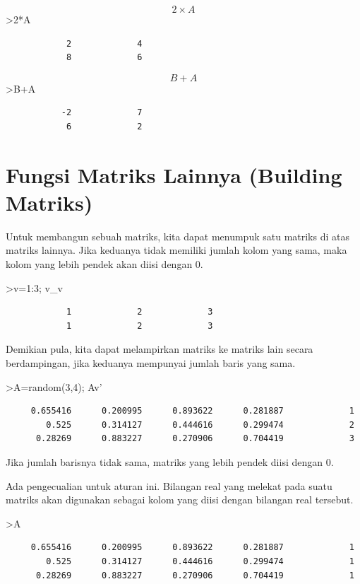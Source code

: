 \documentclass[
]{book}
\begin{document}
\[2 \times A\]\textgreater2*A

\begin{verbatim}
            2             4 
            8             6 
\end{verbatim}

\[B+A\]\textgreater B+A

\begin{verbatim}
           -2             7 
            6             2 
\end{verbatim}

\chapter{Fungsi Matriks Lainnya (Building Matriks)}\label{fungsi-matriks-lainnya-building-matriks}

Untuk membangun sebuah matriks, kita dapat menumpuk satu matriks di atas matriks lainnya. Jika keduanya tidak memiliki jumlah kolom yang sama, maka kolom yang lebih pendek akan diisi dengan 0.

\textgreater v=1:3; v\_v

\begin{verbatim}
            1             2             3 
            1             2             3 
\end{verbatim}

Demikian pula, kita dapat melampirkan matriks ke matriks lain secara berdampingan, jika keduanya mempunyai jumlah baris yang sama.

\textgreater A=random(3,4); A\textbar v'

\begin{verbatim}
     0.655416      0.200995      0.893622      0.281887             1 
        0.525      0.314127      0.444616      0.299474             2 
      0.28269      0.883227      0.270906      0.704419             3 
\end{verbatim}

Jika jumlah barisnya tidak sama, matriks yang lebih pendek diisi dengan 0.

Ada pengecualian untuk aturan ini. Bilangan real yang melekat pada suatu matriks akan digunakan sebagai kolom yang diisi dengan bilangan real tersebut.

\textgreater A

\begin{verbatim}
     0.655416      0.200995      0.893622      0.281887             1 
        0.525      0.314127      0.444616      0.299474             1 
      0.28269      0.883227      0.270906      0.704419             1 
\end{verbatim}
\end{document}

